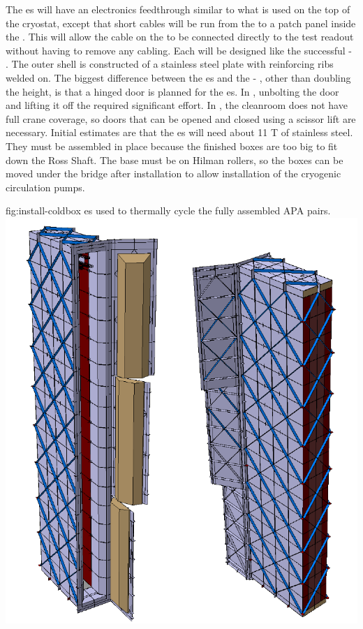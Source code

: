 The \coldbox{}es will have an electronics feedthrough similar to what is used on the top of the  cryostat, except that short cables will be run from the   to a patch panel inside the \coldbox.
This will allow the cable on the  to be connected directly to the test readout without having to remove any cabling. 
Each \coldbox will be designed like the successful - \coldbox. 
The outer shell is constructed of a stainless steel plate with reinforcing ribs welded on. 
The biggest difference between the 
 \coldbox{}es and the - \coldbox, other than doubling the height, is that a hinged door is planned for the  \coldbox{}es. 
In , unbolting the door and lifting it off the \coldbox required significant effort. 
In , the cleanroom does not have full crane coverage, so doors that can be opened and closed using a scissor lift are necessary.
Initial estimates are that the  \coldbox{}es will need about 11 \si{T} of stainless steel. 
They must be assembled in place because the finished boxes are too big to fit down the Ross Shaft. 
The \coldbox base must be on Hilman rollers, so the boxes can be moved under the bridge after installation to allow installation of the cryogenic circulation pumps.
 





\begin{dunefigure}{fig:install-coldbox}
  {\coldbox{}es used to thermally cycle the fully assembled APA pairs. }
\includegraphics[width=.5\textwidth]{graphics/install-coldbox.pdf}
\end{dunefigure}



